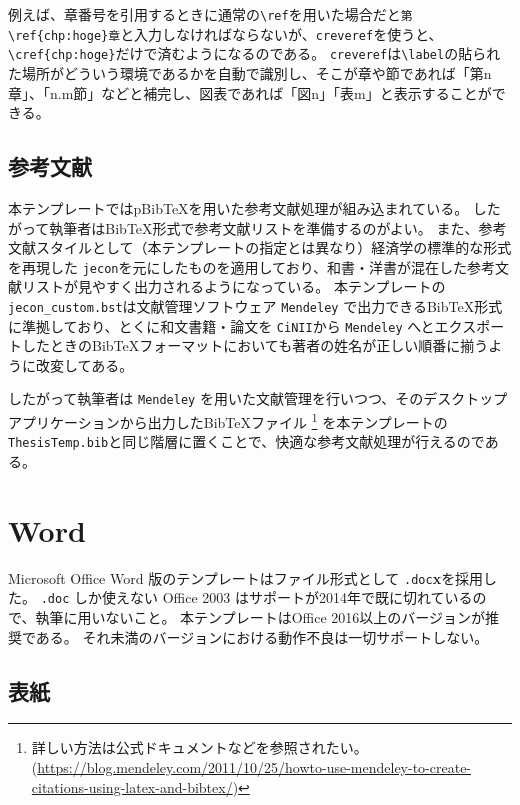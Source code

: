 				例えば、章番号を引用するときに通常の\verb|\ref|を用いた場合だと\verb|第\ref{chp:hoge}章|と入力しなければならないが、\texttt{creveref}を使うと、\verb|\cref{chp:hoge}|だけで済むようになるのである。
				\texttt{creveref}は\verb|\label|の貼られた場所がどういう環境であるかを自動で識別し、そこが章や節であれば「第n章」、「n.m節」などと補完し、図表であれば「図n」「表m」と表示することができる。


			\subsection{参考文献}
				\label{sub:bibtex}

				本テンプレートではpBibTeXを用いた参考文献処理が組み込まれている。
				したがって執筆者はBibTeX形式で参考文献リストを準備するのがよい。
				また、参考文献スタイルとして（本テンプレートの指定とは異なり）経済学の標準的な形式を再現した \texttt{jecon}を元にしたものを適用しており、和書・洋書が混在した参考文献リストが見やすく出力されるようになっている。
				本テンプレートの\texttt{jecon\_custom.bst}は文献管理ソフトウェア \texttt{Mendeley} で出力できるBibTeX形式に準拠しており、とくに和文書籍・論文を \texttt{CiNII}から \texttt{Mendeley} へとエクスポートしたときのBibTeXフォーマットにおいても著者の姓名が正しい順番に揃うように改変してある。

				したがって執筆者は \texttt{Mendeley} を用いた文献管理を行いつつ、そのデスクトップアプリケーションから出力したBibTeXファイル
				\footnote{詳しい方法は公式ドキュメントなどを参照されたい。(\url{https://blog.mendeley.com/2011/10/25/howto-use-mendeley-to-create-citations-using-latex-and-bibtex/})}
				を本テンプレートの\texttt{ThesisTemp.bib}と同じ階層に置くことで、快適な参考文献処理が行えるのである。

	\section{Word}
		\label{word}

		Microsoft Office Word 版のテンプレートはファイル形式として \texttt{.doc}\textbf{x}を採用した。
		\texttt{.doc} しか使えない Office 2003 はサポートが2014年で既に切れているので、執筆に用いないこと。
		本テンプレートはOffice 2016以上のバージョンが推奨である。
		それ未満のバージョンにおける動作不良は一切サポートしない。

		\subsection{表紙}
		  \label{sub:titlepage_w}

